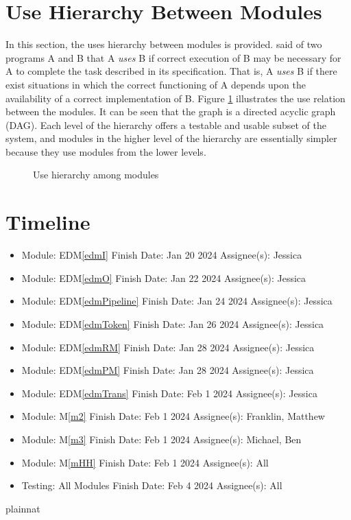 \documentclass[12pt, titlepage]{article}
\newcommand{\mref}[1]{M\ref{#1}}
\newcommand{\edmref}[1]{EDM\ref{#1}}
\begin{document}
\section{Use Hierarchy Between Modules} \label{SecUse}

In this section, the uses hierarchy between modules is
provided. \citet{Parnas1978} said of two programs A and B that A {\em uses} B if
correct execution of B may be necessary for A to complete the task described in
its specification. That is, A {\em uses} B if there exist situations in which
the correct functioning of A depends upon the availability of a correct
implementation of B.  Figure \ref{FigUH} illustrates the use relation between
the modules. It can be seen that the graph is a directed acyclic graph
(DAG). Each level of the hierarchy offers a testable and usable subset of the
system, and modules in the higher level of the hierarchy are essentially simpler
because they use modules from the lower levels.

\begin{figure}[H]
\centering
\caption{Use hierarchy among modules}
\label{FigUH}
\end{figure}

\section{Timeline}

\begin{itemize}
    \item Module: \edmref{edmI} Finish Date: Jan 20 2024 Assignee(s): Jessica
    \item Module: \edmref{edmO} Finish Date: Jan 22 2024 Assignee(s): Jessica
    \item Module: \edmref{edmPipeline} Finish Date: Jan 24 2024 Assignee(s): Jessica
    \item Module: \edmref{edmToken} Finish Date: Jan 26 2024 Assignee(s): Jessica
    \item Module: \edmref{edmRM} Finish Date: Jan 28 2024 Assignee(s): Jessica
    \item Module: \edmref{edmPM} Finish Date: Jan 28 2024 Assignee(s): Jessica
    \item Module: \edmref{edmTrans} Finish Date: Feb 1 2024 Assignee(s): Jessica
    \item Module: \mref{m2} Finish Date: Feb 1 2024 Assignee(s): Franklin, Matthew
    \item Module: \mref{m3} Finish Date: Feb 1 2024 Assignee(s): Michael, Ben
    \item Module: \mref{mHH} Finish Date: Feb 1 2024 Assignee(s): All
    \item Testing: All Modules Finish Date: Feb 4 2024 Assignee(s): All
\end{itemize}


 {plainnat}


\newpage{}
\end{document}
